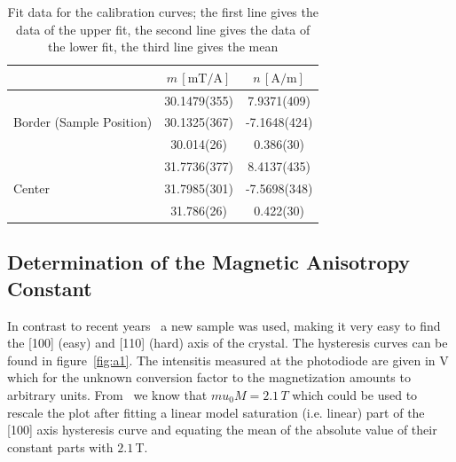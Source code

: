\documentclass[a4paper,10pt]{scrartcl}
\begin{document}
\begin{table}
\begin{center}
\begin{tabular}{lcc}
\toprule
                                          & $m\,[\mbox{mT/A}]$            & $n\,[\mbox{A/m}]$ \\
\midrule
\multirow{3}{*}{Border (Sample Position)} & 30.1479(355) & \phantom{-}7.9371(409) \\
                                          & 30.1325(367) & -7.1648(424) \\
                                          & 30.014(26)\phantom{00}   & \phantom{-}0.386(30)\phantom{00}    \\
\multirow{3}{*}{Center}                   & 31.7736(377) & \phantom{-}8.4137(435) \\
                                          & 31.7985(301) & -7.5698(348) \\
                                          & 31.786(26)\phantom{00} & \phantom{-}0.422(30)\phantom{00}    \\
\bottomrule
\end{tabular}
\end{center}
\par
\caption{Fit data for the calibration curves; the first line gives the data of the upper fit, the second line gives the data of the lower fit, the third line gives the mean \label{tab:calibfits}}
\end{table}


\subsection{Determination of the Magnetic Anisotropy Constant}

In contrast to recent years~\cite{johannes} a new sample was used, making it very easy to find the [100] (easy) and [110] (hard) axis of the crystal. The hysteresis curves can be found in figure~\ref{fig:a1}. The intensitis measured at the photodiode are given in V which for the unknown conversion factor to the magnetization amounts to arbitrary units. From~\cite{skript} we know that $mu_0 M = 2.1\,T$ which could be used to rescale the plot after fitting a linear model saturation (i.e. linear) part of the [100] axis hysteresis curve and equating the mean of the absolute value of their constant parts with $2.1\,$T.
\end{document}
